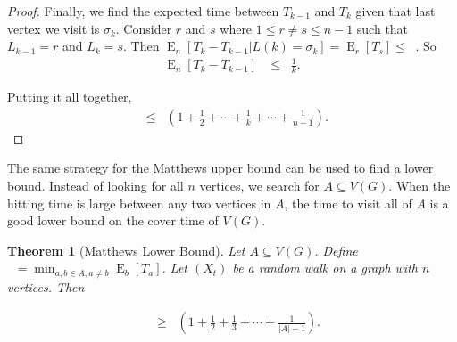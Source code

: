 \documentclass[12pt]{article}
\newtheorem{theorem}{Theorem}
\theoremstyle{definition}
\DeclareMathOperator{\E}{\mathrm{E}}		     %
\DeclareMathOperator{\tcov}{t_\textrm{cov}}      %
\DeclareMathOperator{\hit}{t_{\textrm{hit}}}     %
\DeclareMathOperator{\tmina}{t_\textrm{min}^A}   %
\begin{document}
\begin{proof}
Finally, we find the expected time between $T_{k-1}$ and $T_{k}$
given that last vertex we visit is $\sigma_k$.
Consider $r$ and $s$ where $1 \leq r \neq s \leq n-1$
such that $L_{k-1} = r$ and $L_k = s$.
Then $\E_n[T_k - T_{k-1} | L(k) = \sigma_k] = \E_r[T_s] \leq \hit$.
So
\begin{align}
\E_n[T_k - T_{k-1}] &\leq
\hit \frac{1}{k}. \nonumber 
\end{align}

Putting it all together,
\begin{align}
\tcov \leq \hit \left( 1+ \frac{1}{2} + \cdots + \frac{1}{k} 
+ \cdots + \frac{1}{n-1} \right). \nonumber
\end{align}
\end{proof}

The same strategy for the Matthews upper bound can be used
to find a lower bound.
Instead of looking for all $n$ vertices, we search
for $A \subseteq V(G)$.
When the hitting time is large between any two vertices in $A$,
the time to visit all of $A$ is a good lower bound on the cover time
of $V(G)$.

\begin{theorem}[Matthews Lower Bound]
Let $A \subseteq V(G)$. Define $\tmina = \min_{a,b\in A, a \neq b} \E_b[T_a]$.
Let $(X_t)$ be a random walk on a graph with $n$ vertices. Then \label{thm:matthews_low}
\end{theorem}
\begin{align}
\tcov &\geq \tmina \left(1 + \frac{1}{2} + \frac{1}{3} + \cdots +
\frac{1}{|A| -1} \right). \nonumber
\end{align}
\end{document}
